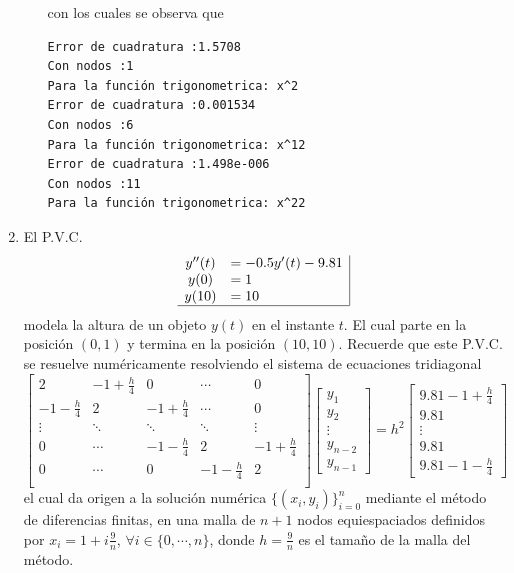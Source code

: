\documentclass[legalpaper,11pt]{article}
\begin{document}
\begin{enumerate}
\begin{enumerate}
con los cuales se observa que
\begin{lstlisting}
Error de cuadratura :1.5708
Con nodos :1
Para la función trigonometrica: x^2
Error de cuadratura :0.001534
Con nodos :6
Para la función trigonometrica: x^12
Error de cuadratura :1.498e-006
Con nodos :11
Para la función trigonometrica: x^22
\end{lstlisting}
\end{enumerate}

\newpage
{}
\item El P.V.C.
$$
\begin{array}{cl|}
y''(t)	&=-0.5y'(t)-9.81\\
y(0)	&=1\\
y(10)	&=10\\ \hline
\end{array}
$$
modela la altura de un objeto $y(t)$ en el instante $t$. El cual parte en la posici\'on $(0,1)$ y termina en la posici\'on $(10,10)$. Recuerde que este P.V.C. se resuelve num\'ericamente resolviendo el sistema de ecuaciones tridiagonal
$$
\begin{bmatrix}
2 & -1+\frac{h}{4} & 0 & \cdots & 0 \\
-1-\frac{h}{4} & 2 & -1+\frac{h}{4} & \cdots& 0 \\
\vdots & \ddots & \ddots & \ddots &\vdots \\
0 & \cdots &-1-\frac{h}{4} & 2 & -1+\frac{h}{4} \\
0 & \cdots & 0 &-1-\frac{h}{4} & 2  \\
\end{bmatrix}
\begin{bmatrix}
y_1\\y_2\\\vdots \\y_{n-2}\\y_{n-1}
\end{bmatrix}
=
h^2\begin{bmatrix}
9.81-1+\frac{h}{4}\\
9.81\\
\vdots \\
9.81\\
9.81-1-\frac{h}{4}
\end{bmatrix}
$$
el cual da origen a la soluci\'on num\'erica $\{(x_i,y_i)\}_{i=0}^n$ mediante el m\'etodo de diferencias finitas, en una malla de $n+1$ nodos equiespaciados definidos por $x_i=1+i\frac{9}{n}$, $\forall i \in\{0,\cdots, n\}$, donde $h=\frac{9}{n}$ es el tama\~{n}o de la malla del m\'etodo.


\end{enumerate}
\end{document}
